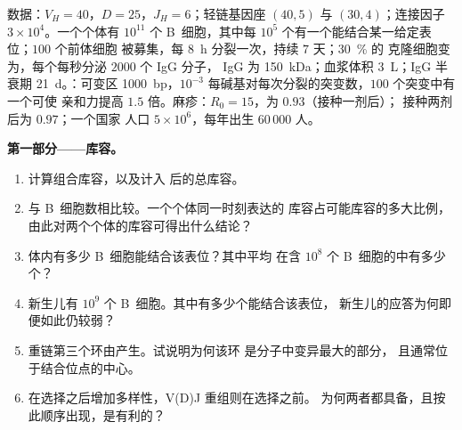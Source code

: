 \begin{problem}
\label{pb:b3:adaptive-immunity:1}
数据：$V_{H} = 40$，$D = 25$，$J_{H} = 6$；轻链基因座 $(40, 5)$ 与
$(30, 4)$；连接因子 $3\times 10^{4}$。一个个体有 $10^{11}$
个 B~细胞，其中每 $10^{5}$ 个有一个能结合某一给定表位；$100$ 个前体细胞
被募集，每 \qty{8}{h} 分裂一次，持续 $7$ 天；\qty{30}{\%} 的
克隆细胞变为，每个每秒分泌 $2000$ 个 IgG 分子，
IgG 为 \qty{150}{kDa}；血浆体积 \qty{3}{L}；IgG 半衰期
\qty{21}{d}。：可变区 \qty{1000}{bp}，$10^{-3}$
每碱基对每次分裂的突变数，$100$ 个突变中有一个可使
亲和力提高 $1.5$ 倍。麻疹：$R_{0} = 15$，为 $0.93$（接种一剂后）；
接种两剂后为 $0.97$；一个国家
人口 $5\times 10^{6}$，每年出生 $60\,000$ 人。

\medskip
\noindent\textbf{第一部分——库容。}
\begin{enumerate}
  \item 计算组合库容，以及计入
        后的总库容。
  \item 与 B~细胞数相比较。一个个体同一时刻表达的
        库容占可能库容的多大比例，
        由此对两个个体的库容可得出什么结论？
  \item 体内有多少 B~细胞能结合该表位？其中平均
        在含 $10^{8}$ 个 B~细胞的中有多少个？
  \item 新生儿有 $10^{9}$ 个 B~细胞。其中有多少个能结合该表位，
        新生儿的应答为何即便如此仍较弱？
  \item {}重链第三个环由产生。试说明为何该环
        是分子中变异最大的部分，
        且通常位于结合位点的中心。
  \item {}在选择之后增加多样性，V(D)J 重组则在选择之前。
        为何两者都具备，且按此顺序出现，是有利的？
\end{enumerate}


\end{problem}
